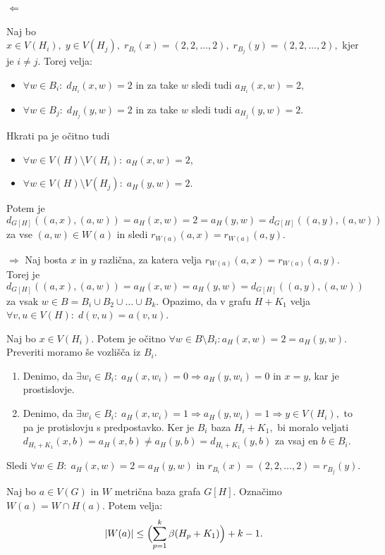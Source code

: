 \documentclass[mat1, tisk]{fmfdelo}
\newcommand{\1}{(1, 1, \ldots, 1)}
\newcommand{\2}{(2, 2, \ldots, 2)}
\begin{document}
\begin{dokaz}
    $\Leftarrow$

    Naj bo $x \in V(H_i), \; y \in V(H_j), \; r_{B_i}(x) = \2, \; r_{B_j}(y) = \2,$ kjer je $i\neq j.$ Torej velja:
    \begin{itemize}
        \item $\forall w \in B_i: \; d_{H_i}(x, w) = 2$ in za take $w$ sledi tudi $a_{H_i}(x, w) = 2,$
        \item $\forall w \in B_j: \; d_{H_j}(y, w) = 2$ in za take $w$ sledi tudi $a_{H_j}(y, w) = 2.$
    \end{itemize}
    Hkrati pa je očitno tudi
    \begin{itemize}
        \item $\forall w \in V(H)\setminus V(H_i): \; a_{H}(x, w) = 2$,
        \item $\forall w \in V(H)\setminus V(H_j): \; a_{H}(y, w) = 2$.
    \end{itemize}
    Potem je 
    $$d_{G[H]}((a, x), (a, w)) = a_H(x, w) = 2 = a_H(y, w)= d_{G[H]}((a, y), (a, w))$$
    za vse $(a, w) \in W(a)$ in sledi $r_{W(a)}(a, x) = r_{W(a)}(a, y).$

    $\Rightarrow$
    Naj bosta $x$ in $y$ različna, za katera velja $r_{W(a)}(a, x) = r_{W(a)}(a, y).$ Torej je 
    $$d_{G[H]}((a, x), (a, w)) = a_H(x, w) = a_H(y, w)= d_{G[H]}((a, y), (a, w))$$ za vsak
    $w \in B = B_i \cup B_2 \cup \ldots \cup B_k.$
    Opazimo, da v grafu $H + K_1$ velja $\forall v, u \in V(H): \; d(v,u) = a(v, u).$

    Naj bo $x \in V(H_i).$ Potem je očitno $\forall w \in B\setminus B_i: a_H(x, w) = 2 = a_H(y, w).$
    Preveriti moramo še vozlišča iz $B_i.$
    \begin{enumerate}
        \item Denimo, da $\exists w_i \in B_i: \; a_H(x, w_i) = 0 \Rightarrow a_H(y,w_i) = 0$ in $x = y$, kar je prostislovje.
        \item Denimo, da $\exists w_i \in B_i: \; a_H(x, w_i) = 1 \Rightarrow a_H(y,w_i) = 1 \Rightarrow y \in V(H_i),$ to pa je 
        protislovju s predpostavko. Ker je $B_i$ baza $H_i + K_1,$ bi moralo veljati 
        $d_{H_i + K_1}(x, b) = a_H(x, b) \neq a_H(y, b) = d_{H_i + K_1}(y, b)$ 
        za vsaj en $b \in B_i$.
    \end{enumerate}
    Sledi $\forall w \in B: \; a_H(x, w) = 2 = a_H(y, w)$ in $r_{B_i}(x) = \2 = r_{B_j}(y).$
\end{dokaz}


\begin{trditev} \label{trditev_zgornja_meja_preseka}
    Naj bo $a \in V(G)$ in $W$ metrična baza grafa $G[H].$ Označimo $W(a) = W \cap H(a).$ Potem velja:
    $$|W(a)| \leq \Bigl ( \sum_{p=1}^{k} \beta(H_p + K_1) \Bigr ) + k - 1.$$
\end{trditev}
\end{document}
